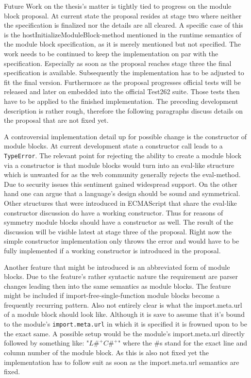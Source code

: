 Future Work on the thesis's matter is tightly tied to progress on the module block proposal. At current state the proposal resides at stage two where neither the specification is finalized nor the details are all cleared. A specific case of this is the hostInitializeModuleBlock-method mentioned in the runtime semantics of the module block specification, as it is merely mentioned but not specified. The work needs to be continued to keep the implementation on par with the specification. Especially as soon as the proposal reaches stage three the final specification is available. Subsequently the implementation has to be adjusted to fit the final version. Furthermore as the proposal progresses official tests will be released and later on embedded into the official Test262 suite. Those tests then have to be applied to the finished implementation. The preceding development description is rather rough, therefore the following paragraphs discuss details on the proposal that are not fixed yet.

A controversial implementation detail up for possible change is the constructor of module blocks. At current development state a constructor call leads to a \texttt{TypeError}. The relevant point for rejecting the ability to create a module block via a constructor is that module blocks would turn into an eval-like structure which is unwanted for as the web community generally rejects the eval-method. Due to security issues this sentiment gained widespread support. On the other hand one can argue that a language's design should be sound and symmetrical. Other structures that were introduced in ECMAScript that share the eval-like constructor discussion do have a working constructor. Thus for reasons of symmetry module blocks should have a constructor as well. The result of the discussion will be visible latest at stage three of the proposal. Right now the simple constructor implementation only throws the error and would have to be fully implemented if a working constructor is introduced in the proposal.

Another feature that might be introduced is an abbreviated form of module blocks. Due to the feature's rather syntactic nature the requirement are parser changes leading then into the same semantics as module blocks. The feature might be included if import-free-single-function module blocks become a frequently recurring pattern. Also not entirely clear is what the import.meta.url of a module block should look like. Although it is save to assume that it's bound to the module's \texttt{import.meta.url} in which it is specified it is frowned upon to be the exact same. A possible setup would be the module's import.meta.url directly followed by something like: "$L\#^+C\#^+$" where the \#s stand for the exact line and column number of the module block. As this is also not fixed yet the implementation has to follow suit as soon as the import.meta.url semantics are fixed.

